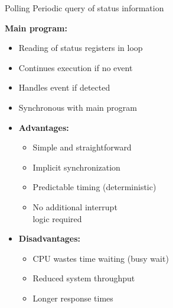 \begin{concept}{Polling} Periodic query of status information

  \textbf{Main program:}
    \begin{itemize}
      \item Reading of status registers in loop
      \item Continues execution if no event
      \item Handles event if detected
      \item Synchronous with main program
    \end{itemize}

  \begin{minipage}{0.6\linewidth}
\begin{itemize}
  \item \textbf{Advantages:}
    \begin{itemize}
      \item Simple and straightforward
      \item Implicit synchronization
      \item Predictable timing (deterministic)
      \item No additional interrupt \\logic required
    \end{itemize}
  \item \textbf{Disadvantages:}
    \begin{itemize}
      \item CPU wastes time waiting (busy wait)
      \item Reduced system throughput
      \item Longer response times
    \end{itemize}
\end{itemize}
\end{minipage}
\begin{minipage}{0.39\linewidth}

\end{minipage}
\end{concept}
